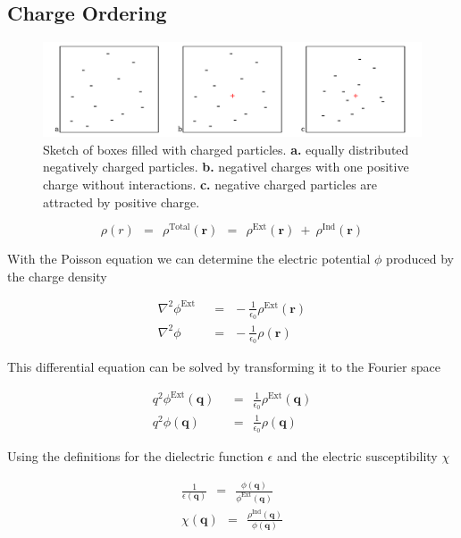 \documentclass[10pt]{report}
\numberwithin{equation}{chapter}
\begin{document}
\subsection{Charge Ordering}

\begin{figure}
  \centering
  \includegraphics[width=1.0\textwidth]{../img/screening_charge_box.pdf}
  \caption{Sketch of boxes filled with charged particles. \textbf{a.} equally distributed negatively charged particles. \textbf{b.} negativel charges with one positive charge without interactions. \textbf{c.} negative charged particles are attracted by positive charge.}
  \label{fig:screening_charge_box}
\end{figure}

\begin{equation} \label{eq:tot_charge_dens}
  \rho(r) ~~=~~ \rho^\text{Total}(\mathbf{r}) ~~=~~ \rho^\text{Ext}(\mathbf{r}) ~+~ \rho^\text{Ind}(\mathbf{r})
\end{equation}


With the Poisson equation we can determine the electric potential $\phi$ produced by the charge density

\begin{align}
  \nabla^2 \phi^\text{Ext} ~~& =~~ -\frac{1}{\epsilon_0} \rho^\text{Ext}(\mathbf{r}) \\
  \nabla^2 \phi	~~& =~~ -\frac{1}{\epsilon_0} \rho(\mathbf{r})
\end{align}


This differential equation can be solved by transforming it to the Fourier space

\begin{align}
  q^2 \phi^\text{Ext}(\mathbf{q}) ~~& =~~ \frac{1}{\epsilon_0} \rho^\text{Ext}(\mathbf{q}) \\
  q^2 \phi (\mathbf{q}) ~~&=~~ \frac{1}{\epsilon_0}  \rho(\mathbf{q})
\end{align}


Using the definitions for the dielectric function $\epsilon$ and the electric susceptibility $\chi$

\begin{align}  \label{eq:screen_dielect}
  \frac{1}{\epsilon(\mathbf{q})} ~~=~~ \frac{\phi(\mathbf{q})}{\phi^\text{Ext}(\mathbf{q})} \\
  \label{eq:screen_suscept}
  \chi(\mathbf{q}) ~~=~~ \frac{\rho^\text{Ind}(\mathbf{q})}{\phi(\mathbf{q})}
\end{align}
\end{document}
